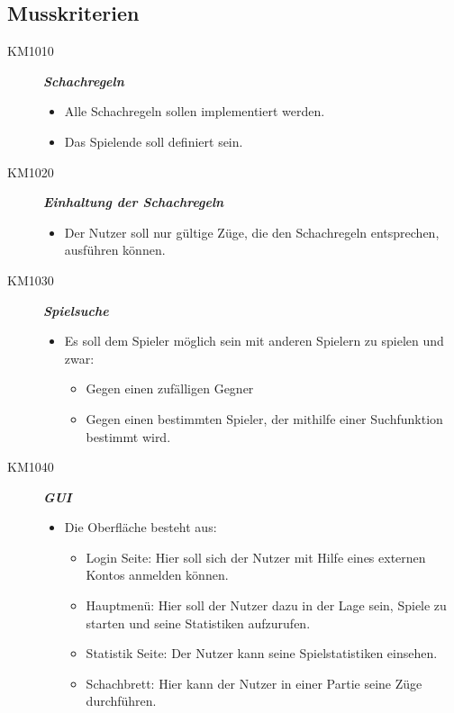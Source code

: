\documentclass[parskip=full]{scrartcl}
\begin{document}
\subsection{Musskriterien}
\begin{description}
\item[KM1010] \textbf{\textit{\gls{Schachregeln}}}
\begin{itemize}
	\item Alle \gls{Schachregeln} sollen implementiert werden.
	\item Das Spielende soll definiert sein.	
\end{itemize}
\item[KM1020] \textbf{\textit{Einhaltung der \gls{Schachregeln}}}
\begin{itemize}
	\item Der Nutzer soll nur gültige Züge, die den \gls{Schachregeln} entsprechen, ausführen können.
\end{itemize}
\item[KM1030] \textbf{\textit{Spielsuche}}
\begin{itemize}
	\item Es soll dem Spieler möglich sein mit anderen Spielern zu spielen und zwar:
	\begin{itemize}
		\item Gegen einen zufälligen Gegner
		\item Gegen einen bestimmten Spieler, der mithilfe einer Suchfunktion bestimmt wird.
	\end{itemize}
\end{itemize}
\item[KM1040] \textbf{\textit{\gls{GUI}}}
\begin{itemize}
	\item Die Oberfläche besteht aus:
	\begin{itemize}		
		\item Login Seite: Hier soll sich der Nutzer mit Hilfe eines externen Kontos anmelden können.
		
		\item Hauptmenü: Hier soll der Nutzer dazu in der Lage sein, Spiele zu starten und seine Statistiken aufzurufen.
		
		\item Statistik Seite: Der Nutzer kann seine Spielstatistiken einsehen.
		
		\item Schachbrett: Hier kann der Nutzer in einer Partie seine Züge durchführen.
		

\end{itemize}
\end{itemize}
\end{description}
\end{document}
